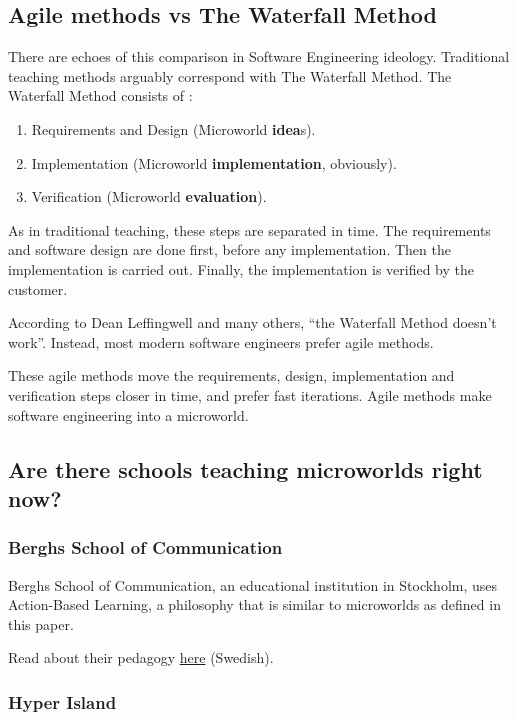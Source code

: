 \subsection{Agile methods vs The Waterfall Method}

There are echoes of this comparison in Software Engineering ideology.
Traditional teaching methods arguably correspond with The Waterfall
Method. The Waterfall Method consists of \cite{wiki:waterfall}: 

\begin{enumerate}
\item Requirements and Design (Microworld \textbf{idea}s). 
\item Implementation (Microworld \textbf{implementation}, obviously). 
\item Verification (Microworld \textbf{evaluation}).
\end{enumerate}

As in traditional teaching, these steps are separated in time. The
requirements and software design are done first, before any
implementation. Then the implementation is carried out. Finally, the
implementation is verified by the customer.

According to Dean Leffingwell and many others, ``the Waterfall Method
doesn't work''\cite{leffingwell}. Instead, most modern software engineers
prefer agile methods.

These agile methods move the requirements, design, implementation and
verification steps closer in time, and prefer fast iterations. Agile
methods make software engineering into a microworld.

\subsection{Are there schools teaching microworlds right now?}

\subsubsection{Berghs School of Communication}

Berghs School of Communication, an educational institution in Stockholm, uses Action-Based Learning, a philosophy that is similar to microworlds as defined in this paper.

Read about their pedagogy \href{http://www.berghs.se/content/berghs-pedagogik}{here} (Swedish). 

\subsubsection{Hyper Island}

